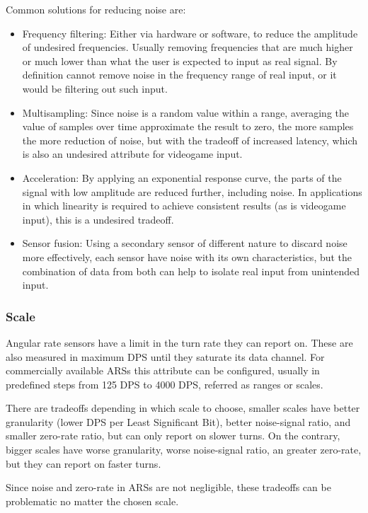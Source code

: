 \documentclass[10pt, twocolumn, a4paper]{article}
\begin{document}
        Common solutions for reducing noise are:
        \begin{itemize}
            \item Frequency filtering: Either via hardware or software, to reduce the amplitude of undesired frequencies. Usually removing frequencies that are much higher or much lower than what the user is expected to input as real signal. By definition cannot remove noise in the frequency range of real input, or it would be filtering out such input.
            \item Multisampling: Since noise is a random value within a range, averaging the value of samples over time approximate the result to zero, the more samples the more reduction of noise, but with the tradeoff of increased latency, which is also an undesired attribute for videogame input.
            \item Acceleration: By applying an exponential response curve, the parts of the signal with low amplitude are reduced further, including noise. In applications in which linearity is required to achieve consistent results (as is videogame input), this is a undesired tradeoff.
            \item Sensor fusion: Using a secondary sensor of different nature to discard noise more effectively, each sensor have noise with its own characteristics, but the combination of data from both can help to isolate real input from unintended input.
        \end{itemize}

    \subsubsection{Scale}
        Angular rate sensors have a limit in the turn rate they can report on. These are also measured in maximum DPS until they saturate its data channel. For commercially available ARSs this attribute can be configured, usually in predefined steps from 125 DPS to 4000 DPS, referred as ranges or scales.

        There are tradeoffs depending in which scale to choose, smaller scales have better granularity (lower DPS per Least Significant Bit), better noise-signal ratio, and smaller zero-rate ratio, but can only report on slower turns. On the contrary, bigger scales have worse granularity, worse noise-signal ratio, an greater zero-rate, but they can report on faster turns.

        Since noise and zero-rate in ARSs are not negligible, these tradeoffs can be problematic no matter the chosen scale.
\end{document}
